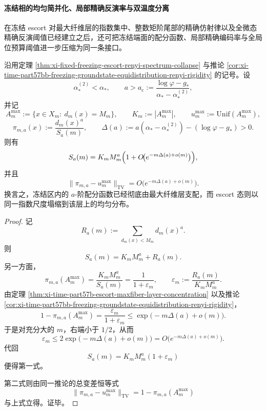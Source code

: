 \paragraph{冻结相的均匀简并化、局部精确反演率与双温度分离}
在冻结 escort 对最大纤维层的指数集中、整数矩阶尾部的精确仿射律以及全微态精确反演阈值已经建立之后，还可把冻结端面的配分函数、局部精确编码率与全局位预算阈值进一步压缩为同一条接口。

\begin{theorem}[冻结相的均匀简并化]\label{thm:xi-time-part57bc-freezing-uniform-degeneracy}
沿用定理 \ref{thm:xi-fixed-freezing-escort-renyi-spectrum-collapse} 与推论 \ref{cor:xi-time-part57bb-freezing-groundstate-equidistribution-renyi-rigidity} 的记号。设
\[
\alpha_*^{(2)}<\alpha_*,
\qquad
a>a_{\mathrm c}:=\frac{\log\varphi-g_*}{\alpha_*-\alpha_*^{(2)}},
\]
并记
\[
A_m^{\max}:=\{x\in X_m:\ d_m(x)=M_m\},
\qquad
K_m:=|A_m^{\max}|,
\qquad
u_m^{\max}:=\mathrm{Unif}(A_m^{\max}),
\]
\[
\pi_{m,a}(x):=\frac{d_m(x)^a}{S_a(m)},
\qquad
\Delta(a):=a(\alpha_*-\alpha_*^{(2)})-(\log\varphi-g_*)>0.
\]
则有
\[
S_a(m)=K_mM_m^a\Bigl(1+O\!\bigl(e^{-m\Delta(a)+o(m)}\bigr)\Bigr),
\]
并且
\[
\|\pi_{m,a}-u_m^{\max}\|_{\mathrm{TV}}
=
O\!\bigl(e^{-m\Delta(a)+o(m)}\bigr).
\]
换言之，冻结区内的 \(a\)-阶配分函数已经彻底由最大纤维层支配，而 escort 态则以同一指数尺度塌缩到该层上的均匀分布。
\end{theorem}
\begin{proof}
记
\[
R_a(m):=\sum_{d_m(x)<M_m}d_m(x)^a.
\]
则
\[
S_a(m)=K_mM_m^a+R_a(m).
\]
另一方面，
\[
\pi_{m,a}(A_m^{\max})
=
\frac{K_mM_m^a}{S_a(m)}
=
\frac{1}{1+\varepsilon_m},
\qquad
\varepsilon_m:=\frac{R_a(m)}{K_mM_m^a}.
\]
由定理 \ref{thm:xi-time-part57b-escort-maxfiber-layer-concentration} 以及推论 \ref{cor:xi-time-part57bb-freezing-groundstate-equidistribution-renyi-rigidity}，
\[
1-\pi_{m,a}(A_m^{\max})
=
\frac{\varepsilon_m}{1+\varepsilon_m}
\le
\exp\!\bigl(-m\Delta(a)+o(m)\bigr).
\]
于是对充分大的 \(m\)，右端小于 \(1/2\)，从而
\[
\varepsilon_m
\le
2\exp\!\bigl(-m\Delta(a)+o(m)\bigr)
=
O\!\bigl(e^{-m\Delta(a)+o(m)}\bigr).
\]
代回
\[
S_a(m)=K_mM_m^a(1+\varepsilon_m)
\]
便得第一式。

第二式则由同一推论的总变差恒等式
\[
\|\pi_{m,a}-u_m^{\max}\|_{\mathrm{TV}}
=
1-\pi_{m,a}(A_m^{\max})
\]
与上式立得。证毕。
\end{proof}

